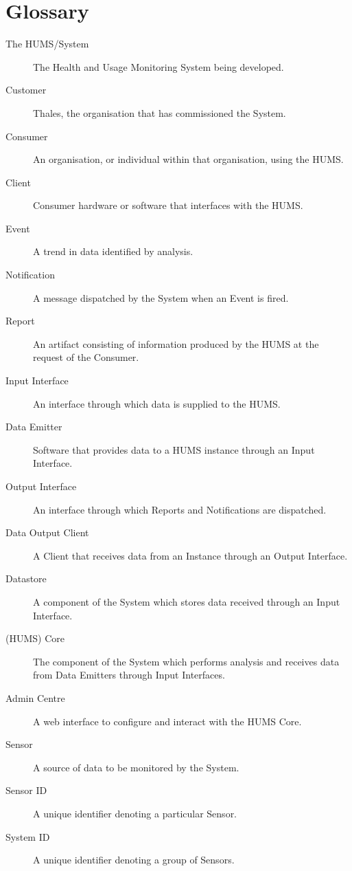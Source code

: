 \documentclass[10pt,a4paper]{article}
\begin{document}
\section{Glossary}
\label{sec:glossary}
\begin{description}%
	\item[The HUMS/System] The Health and Usage Monitoring System being developed.
	
	\vspace{0.15cm}
	\item[Customer] Thales, the organisation that has commissioned the System.
	\item[Consumer] An organisation, or individual within that organisation, using the HUMS.
	\item[Client] Consumer hardware or software that interfaces with the HUMS.
	
	\vspace{0.15cm}
	\item[Event] A trend in data identified by analysis.
	\item[Notification] A message dispatched by the System when an Event is fired.
	\item[Report] An artifact consisting of information produced by the HUMS at the request of the Consumer.
	
	\vspace{0.15cm}
	\item[Input Interface] An interface through which data is supplied to the HUMS.
	\item[Data Emitter] Software that provides data to a HUMS instance through an Input Interface.
	\item[Output Interface] An interface through which Reports and Notifications are dispatched.
	\item[Data Output Client] A Client that receives data from an Instance through an Output Interface.
    \item[Datastore] A component of the System which stores data received through an Input Interface.
    \item[(HUMS) Core] The component of the System which performs analysis and receives data from Data Emitters through Input Interfaces.
	\item[Admin Centre] A web interface to configure and interact with the HUMS Core.

	\vspace{0.15cm}
	\item[Sensor] A source of data to be monitored by the System.
	\item[Sensor ID] A unique identifier denoting a particular Sensor.
	\item[System ID] A unique identifier denoting a group of Sensors.
\end{description}
\end{document}
